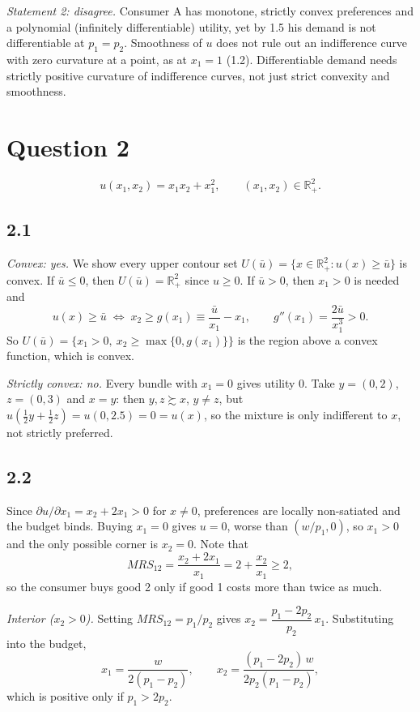 \documentclass[12pt,letterpaper]{article}
\begin{document}
\textit{Statement 2: disagree.} Consumer A has monotone, strictly convex preferences and a polynomial (infinitely differentiable) utility, yet by 1.5 his demand is not differentiable at $p_1=p_2$. Smoothness of $u$ does not rule out an indifference curve with zero curvature at a point, as at $x_1=1$ (1.2). Differentiable demand needs strictly positive curvature of indifference curves, not just strict convexity and smoothness.

\section*{Question 2}

\[
u(x_1,x_2) = x_1x_2 + x_1^2, \qquad (x_1,x_2)\in\mathbb{R}^2_+ .
\]

\subsection*{2.1}

\textit{Convex: yes.} We show every upper contour set $U(\bar u)=\{x\in\mathbb{R}^2_+ : u(x)\ge\bar u\}$ is convex. If $\bar u\le0$, then $U(\bar u)=\mathbb{R}^2_+$ since $u\ge0$. If $\bar u>0$, then $x_1>0$ is needed and
\[
u(x)\ge\bar u \;\Longleftrightarrow\; x_2\ge g(x_1)\equiv\frac{\bar u}{x_1}-x_1, \qquad g''(x_1)=\frac{2\bar u}{x_1^3}>0 .
\]
So $U(\bar u)=\{x_1>0,\ x_2\ge\max\{0,g(x_1)\}\}$ is the region above a convex function, which is convex.

\textit{Strictly convex: no.} Every bundle with $x_1=0$ gives utility $0$. Take $y=(0,2)$, $z=(0,3)$ and $x=y$: then $y,z\succsim x$, $y\ne z$, but $u(\tfrac12y+\tfrac12z)=u(0,2.5)=0=u(x)$, so the mixture is only indifferent to $x$, not strictly preferred.

\subsection*{2.2}

Since $\partial u/\partial x_1=x_2+2x_1>0$ for $x\ne0$, preferences are locally non-satiated and the budget binds. Buying $x_1=0$ gives $u=0$, worse than $(w/p_1,0)$, so $x_1>0$ and the only possible corner is $x_2=0$. Note that
\[
MRS_{12}=\frac{x_2+2x_1}{x_1}=2+\frac{x_2}{x_1}\ge 2,
\]
so the consumer buys good 2 only if good 1 costs more than twice as much.

\textit{Interior ($x_2>0$).} Setting $MRS_{12}=p_1/p_2$ gives $x_2=\dfrac{p_1-2p_2}{p_2}\,x_1$. Substituting into the budget,
\[
x_1=\frac{w}{2(p_1-p_2)}, \qquad x_2=\frac{(p_1-2p_2)\,w}{2p_2(p_1-p_2)},
\]
which is positive only if $p_1>2p_2$.
\end{document}
